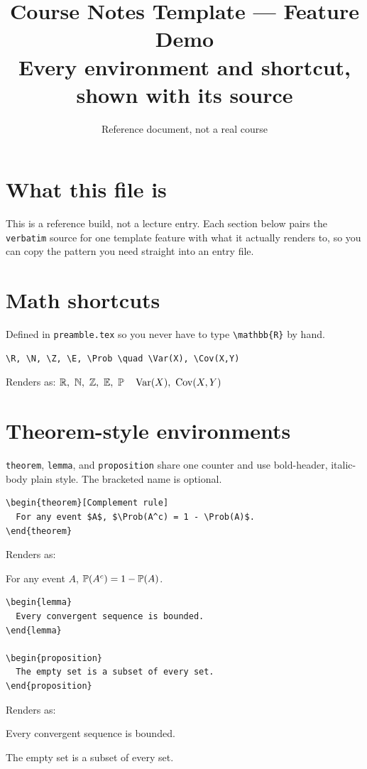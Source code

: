 \documentclass[11pt,letterpaper]{article}
\title{Course Notes Template --- Feature Demo\\[0.5em]\large Every environment and shortcut, shown with its source}
\author{Reference document, not a real course}
\date{}
\begin{document}
\maketitle
\tableofcontents
\newpage

\section{What this file is}
This is a reference build, not a lecture entry. Each section below pairs the
\texttt{verbatim} source for one template feature with what it actually
renders to, so you can copy the pattern you need straight into an entry file.

\section{Math shortcuts}
Defined in \texttt{preamble.tex} so you never have to type \texttt{\textbackslash mathbb\{R\}} by hand.

\begin{verbatim}
\R, \N, \Z, \E, \Prob \quad \Var(X), \Cov(X,Y)
\end{verbatim}
Renders as: $\mathbb{R},\ \mathbb{N},\ \mathbb{Z},\ \mathbb{E},\ \mathbb{P} \quad \operatorname{Var}(X),\ \operatorname{Cov}(X,Y)$

\section{Theorem-style environments}
\texttt{theorem}, \texttt{lemma}, and \texttt{proposition} share one counter
and use bold-header, italic-body plain style. The bracketed name is optional.

\begin{verbatim}
\begin{theorem}[Complement rule]
  For any event $A$, $\Prob(A^c) = 1 - \Prob(A)$.
\end{theorem}
\end{verbatim}
Renders as:
\begin{theorem}
  For any event $A$, $\mathbb{P}(A^c) = 1 - \mathbb{P}(A)$.
\end{theorem}

\begin{verbatim}
\begin{lemma}
  Every convergent sequence is bounded.
\end{lemma}

\begin{proposition}
  The empty set is a subset of every set.
\end{proposition}
\end{verbatim}
Renders as:
\begin{lemma}
  Every convergent sequence is bounded.
\end{lemma}
\begin{proposition}
  The empty set is a subset of every set.
\end{proposition}
\end{document}
